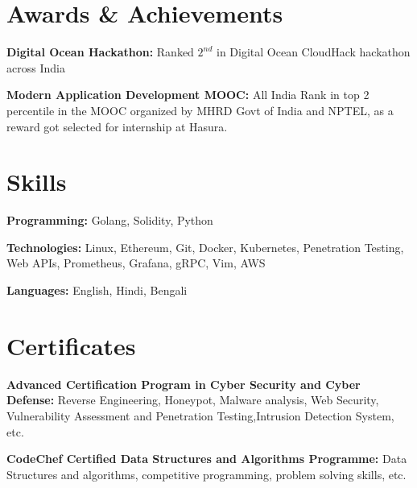\documentclass[letterpaper,11pt]{article}
\newcommand{\resumeSubHeadingListStart}{\begin{itemize}[leftmargin=0.15in, label={}]}
\newcommand{\resumeSubHeadingListEnd}{\end{itemize}}
\begin{document}
\section{Awards \& Achievements}
  \vspace{2pt}
  \resumeSubHeadingListStart
    \small{\item{
        \textbf{Digital Ocean Hackathon: }{ Ranked $2^{nd}$ in Digital Ocean CloudHack hackathon across India} \\ \vspace{3pt}
        
        \textbf{Modern Application Development MOOC: }{All India Rank in top 2 percentile in the MOOC organized by MHRD Govt of India and NPTEL, as a reward got selected for internship at Hasura.} \\ \vspace{3pt}
        
    }}
  \resumeSubHeadingListEnd



\section{Skills}
  \vspace{2pt}
  \resumeSubHeadingListStart
    \small{\item{
        \textbf{Programming:}{ Golang, Solidity, Python } \\ \vspace{3pt}
        
        \textbf{Technologies:}{ Linux, Ethereum, Git, Docker, Kubernetes, Penetration Testing, Web APIs, Prometheus, Grafana, gRPC, Vim, AWS} \\ \vspace{3pt}
        
        \textbf{Languages:}{ English, Hindi, Bengali }
    }}
  \resumeSubHeadingListEnd


\section{Certificates}
  \resumeSubHeadingListStart
	\small{\item{
        \textbf{Advanced Certification Program in Cyber Security and Cyber Defense: }{Reverse Engineering, Honeypot, Malware analysis, Web Security, Vulnerability Assessment and Penetration Testing,Intrusion Detection System, etc.} \\ \vspace{3pt}
        
        \textbf{CodeChef Certified Data Structures and Algorithms Programme: }{Data Structures and algorithms, competitive programming, problem solving skills, etc. }
    }}
  \resumeSubHeadingListEnd
\end{document}
